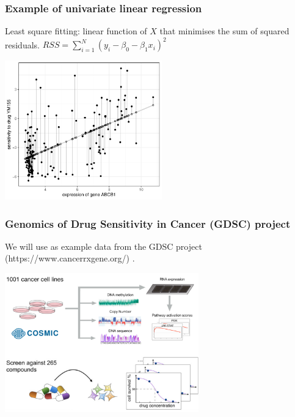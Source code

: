 \documentclass[notes]{beamer}          %
\begin{document}
\begin{frame}
\frametitle{Example of univariate linear regression}
Least square fitting: linear function of $X$ that minimises the sum of squared residuals. $RSS = \sum_{i=1}^N (y_i - \beta_0 - \beta_1 x_i)^2$

\begin{center}
\includegraphics[height=6cm]{../figures/week_2_linear_models/Univariate_linear_regression_2.pdf}
\end{center}

\end{frame}

\begin{frame}
\frametitle{Genomics of Drug Sensitivity in Cancer (GDSC) project}
We will use as example data from the GDSC project (https://www.cancerrxgene.org/) \cite{GDSC}.

\begin{center}
\includegraphics[height=6cm]{../figures/week_2_linear_models/GDSC_study_description.png}
\end{center}

\end{frame}
\end{document}
